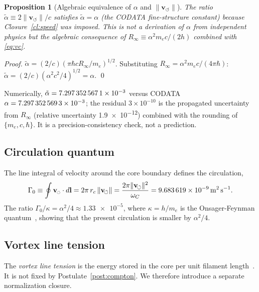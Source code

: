 \documentclass[aps,pra,preprint,longbibliography,nofootinbib]{revtex4-2}
\newtheorem{proposition}{Proposition}
\newcommand{\rotarrow}{%
  \mathchoice{\mkern-2mu\scriptstyle\boldsymbol{\circlearrowleft}}%
             {\mkern-2mu\scriptstyle\boldsymbol{\circlearrowleft}}%
             {\mkern-2mu\scriptscriptstyle\boldsymbol{\circlearrowleft}}%
             {\mkern-2mu\scriptscriptstyle\boldsymbol{\circlearrowleft}}}
\newcommand{\vc}{\mathbf{v}_{\rotarrow}}        %
\newcommand{\vnorm}{\lVert\mathbf{v}_{\!\boldsymbol{\circlearrowleft}}\rVert} %
\newcommand{\rc}{r_c}                            %
\newcommand{\omC}{\omega_C}                      %
\newcommand{\Rinf}{R_\infty}                     %
\newcommand{\Gz}{\Gamma_0}                       %
\begin{document}
\begin{proposition}[Algebraic equivalence of $\alpha$ and $\vnorm$]
\label{prop:alpha}
The ratio $\tilde\alpha \equiv 2\vnorm/c$
satisfies $\tilde\alpha = \alpha$ (the CODATA fine-structure
constant) because Closure~\ref{cl:speed} was imposed.
This is not a derivation of $\alpha$ from independent physics
but the algebraic consequence of $\Rinf \equiv \alpha^2 m_e c/(2h)$
combined with \eqref{eq:vc}.
\end{proposition}

\begin{proof}
$\tilde\alpha = (2/c)(\pi\hbar c\Rinf/m_e)^{1/2}$.
Substituting $\Rinf = \alpha^2 m_e c/(4\pi\hbar)$:
$\tilde\alpha = (2/c)(\alpha^2 c^2/4)^{1/2} = \alpha$. \qed
\end{proof}

Numerically, $\tilde\alpha = \num{7.297\,352\,567\,1e-3}$
versus CODATA $\alpha = \num{7.297\,352\,569\,3e-3}$;
the residual $3\times10^{-10}$ is the propagated uncertainty
from $\Rinf$ (relative uncertainty \SI{1.9e-12}{}) combined with
the rounding of $\{m_e, c, \hbar\}$.
It is a precision-consistency check, not a prediction.

\subsection{Circulation quantum}
\label{sec:Gamma0}

The line integral of velocity around the core boundary defines the
circulation,
\begin{equation}
  \Gz \equiv \oint \vc\cdot d\mathbf{l}
           = 2\pi\,\rc\,\vnorm
           = \frac{2\pi\vnorm^2}{\omC}
           = \SI{9.683\,619e-9}{\meter\squared\per\second}.
  \label{eq:Gamma0}
\end{equation}
The ratio $\Gz/\kappa = \alpha^2/4 \approx \num{1.33e-5}$,
where $\kappa = h/m_e$ is the Onsager-Feynman quantum~\cite{Onsager1949,Feynman1955},
showing that the present circulation is smaller by $\alpha^2/4$.

\subsection{Vortex line tension}
\label{sec:Tc}

The \emph{vortex line tension} is the energy stored in the core per
unit filament length~\cite{Saffman1992}.  It is not fixed by
Postulate~\ref{post:compton}.  We therefore introduce a separate
normalization closure.
\end{document}

